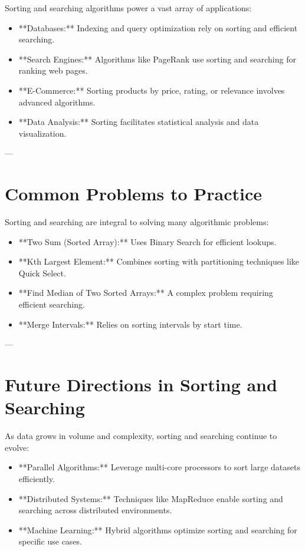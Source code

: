 Sorting and searching algorithms power a vast array of applications:
\begin{itemize}
    \item **Databases:** Indexing and query optimization rely on sorting and efficient searching.
    \item **Search Engines:** Algorithms like PageRank use sorting and searching for ranking web pages.
    \item **E-Commerce:** Sorting products by price, rating, or relevance involves advanced algorithms.
    \item **Data Analysis:** Sorting facilitates statistical analysis and data visualization.
\end{itemize}

---

\section*{Common Problems to Practice}

Sorting and searching are integral to solving many algorithmic problems:
\begin{itemize}
    \item **Two Sum (Sorted Array):** Uses Binary Search for efficient lookups.
    \item **Kth Largest Element:** Combines sorting with partitioning techniques like Quick Select.
    \item **Find Median of Two Sorted Arrays:** A complex problem requiring efficient searching.
    \item **Merge Intervals:** Relies on sorting intervals by start time.
\end{itemize}

---

\section*{Future Directions in Sorting and Searching}

As data grows in volume and complexity, sorting and searching continue to evolve:
\begin{itemize}
    \item **Parallel Algorithms:** Leverage multi-core processors to sort large datasets efficiently.
    \item **Distributed Systems:** Techniques like MapReduce enable sorting and searching across distributed environments.
    \item **Machine Learning:** Hybrid algorithms optimize sorting and searching for specific use cases.
\end{itemize}

